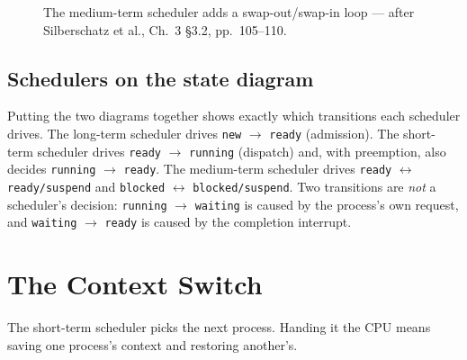 \documentclass[11pt]{article}
\begin{document}
\begin{figure}[h]
\centering
{}
\caption{The medium-term scheduler adds a swap-out/swap-in loop --- after
Silberschatz et al., Ch.~3 \S3.2, pp.~105--110.}
\label{fig:swap}
\end{figure}

\subsection{Schedulers on the state diagram}

Putting the two diagrams together shows exactly which transitions each scheduler
drives. The long-term scheduler drives \texttt{new} $\to$ \texttt{ready}
(admission). The short-term scheduler drives \texttt{ready} $\to$
\texttt{running} (dispatch) and, with preemption, also decides
\texttt{running} $\to$ \texttt{ready}. The medium-term scheduler drives
\texttt{ready} $\leftrightarrow$ \texttt{ready/suspend} and \texttt{blocked}
$\leftrightarrow$ \texttt{blocked/suspend}. Two transitions are \emph{not} a
scheduler's decision: \texttt{running} $\to$ \texttt{waiting} is caused by the
process's own request, and \texttt{waiting} $\to$ \texttt{ready} is caused by
the completion interrupt.

\section{The Context Switch}
\label{sec:cs}

\noindent{}

The short-term scheduler picks the next process. Handing it the CPU means
saving one process's context and restoring another's.
\end{document}
